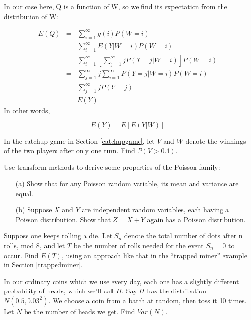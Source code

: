 In our case here, Q is a function of W, so we find its expectation from
the distribution of W:

\begin{eqnarray*}
E(Q) & = & \sum ^{\infty }_{i=1}g(i) P(W=i)\\
 & = & \sum ^{\infty }_{i=1}E(Y|W=i)P(W=i)\\
 & = & \sum ^{\infty }_{i=1} \left [ \sum ^{\infty }_{j=1}jP(Y=j|W=i) \right ] P(W=i) \\
 & = & \sum ^{\infty }_{j=1}j\sum ^{\infty }_{i=1}P(Y=j|W=i)P(W=i)\\
 & = & \sum ^{\infty }_{j=1}jP(Y=j)\\
 & = & E(Y)
\end{eqnarray*}
 In other words, 

\begin{equation}
E(Y)=E[E(Y|W)]
\end{equation}

\startproblemset

\oneproblem
In the catchup game in Section \ref{catchupgame}, let $V$ and $W$ denote
the winnings of the two players after only one turn.  Find $P(V > 0.4)$.

\oneproblem
Use transform methods to derive some properties of the Poisson family:

\begin{itemize}

\item [(a)] Show that for any Poisson random variable, its mean and
variance are equal.

\item [(b)] Suppose $X$ and $Y$ are independent random variables, each
having a Poisson distribution.  Show that $Z = X+Y$ again has a Poisson
distribution.

\end{itemize}

\oneproblem Suppose one keeps rolling a die. Let $S_n$ denote the total
number of dots after n rolls, mod 8, and let $T$ be the number of rolls
needed for the event $S_n = 0$ to occur. Find $E(T)$, using an approach
like that in the ``trapped miner'' example in Section
\ref{trappedminer}.

\oneproblem
In our ordinary coins which we use every day, each one has a slightly 
different probability of heads, which we'll call $H$.  Say $H$ has 
the distribution $N(0.5, 0.03^2)$.  We choose a coin from a batch at 
random, then toss it 10 times.  Let $N$ be the number of heads we get.  
Find $Var(N)$.


